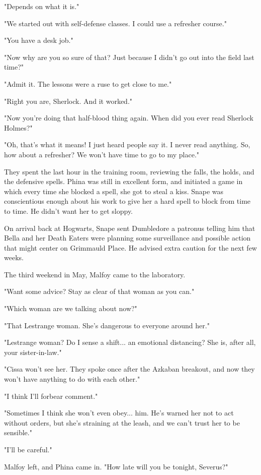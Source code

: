 "Depends on what it is."

"We started out with self-defense classes. I could use a refresher course."

"You have a desk job."

"Now why are you so sure of that? Just because I didn't go out into the field last time?"

"Admit it. The lessons were a ruse to get close to me."

"Right you are, Sherlock. And it worked."

"Now you're doing that half-blood thing again. When did you ever read Sherlock Holmes?"

"Oh, that's what it means! I just heard people say it. I never read anything. So, how about a refresher? We won't have time to go to my place."

They spent the last hour in the training room, reviewing the falls, the holds, and the defensive spells. Phina was still in excellent form, and initiated a game in which every time she blocked a spell, she got to steal a kiss. Snape was conscientious enough about his work to give her a hard spell to block from time to time. He didn't want her to get sloppy.

On arrival back at Hogwarts, Snape sent Dumbledore a patronus telling him that Bella and her Death Eaters were planning some surveillance and possible action that might center on Grimmauld Place. He advised extra caution for the next few weeks.

The third weekend in May, Malfoy came to the laboratory.

"Want some advice? Stay as clear of that woman as you can."

"Which woman are we talking about now?"

"That Lestrange woman. She's dangerous to everyone around her."

"Lestrange woman? Do I sense a shift... an emotional distancing? She is, after all, your sister-in-law."

"Cissa won't see her. They spoke once after the Azkaban breakout, and now they won't have anything to do with each other."

"I think I'll forbear comment."

"Sometimes I think she won't even obey... him. He's warned her not to act without orders, but she's straining at the leash, and we can't trust her to be sensible."

"I'll be careful."

Malfoy left, and Phina came in. "How late will you be tonight, Severus?"

